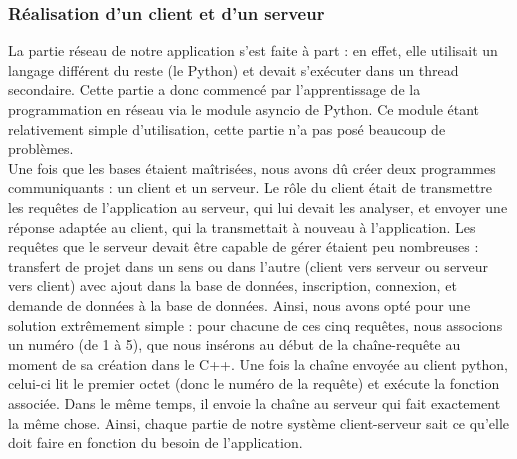 \documentclass[twoside]{report}
\begin{document}
\subsubsection{Réalisation d'un client et d'un serveur}
La partie réseau de notre application s'est faite à part : en effet, elle utilisait un langage différent du reste (le Python) et devait s'exécuter dans un thread secondaire. Cette partie a donc commencé par l'apprentissage de la programmation en réseau via le module asyncio de Python. Ce module étant relativement simple d'utilisation, cette partie n'a pas posé beaucoup de problèmes. \\
Une fois que les bases étaient maîtrisées, nous avons dû créer deux programmes communiquants : un client et un serveur. Le rôle du client était de transmettre les requêtes de l'application au serveur, qui lui devait les analyser, et envoyer une réponse adaptée au client, qui la transmettait à nouveau à l'application. Les requêtes que le serveur devait être capable de gérer étaient peu nombreuses : transfert de projet dans un sens ou dans l'autre (client vers serveur ou serveur vers client) avec ajout dans la base de données, inscription, connexion, et demande de données à la base de données. Ainsi, nous avons opté pour une solution extrêmement simple : pour chacune de ces cinq requêtes, nous associons un numéro (de 1 à 5), que nous insérons au début de la chaîne-requête au moment de sa création dans le C++. Une fois la chaîne envoyée au client python, celui-ci lit le premier octet (donc le numéro de la requête) et exécute la fonction associée. Dans le même temps, il envoie la chaîne au serveur qui fait exactement la même chose. Ainsi, chaque partie de notre système client-serveur sait ce qu'elle doit faire en fonction du besoin de l'application.
\end{document}
